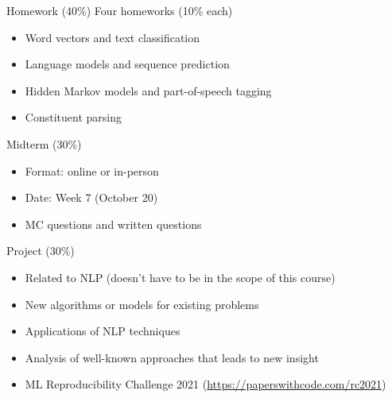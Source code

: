 \documentclass[usenames,dvipsnames,notes,11pt,aspectratio=169]{beamer}
\begin{document}
\begin{frame}
    {Homework (40\%)}
    Four homeworks (10\% each)
    \begin{itemize}
        \itemsep1em
        \item Word vectors and text classification
        \item Language models and sequence prediction
        \item Hidden Markov models and part-of-speech tagging 
        \item Constituent parsing 
    \end{itemize}
\end{frame}

\begin{frame}
    {Midterm (30\%)}
    \begin{itemize}
        \itemsep1em
        \item Format: online or in-person
        \item Date: Week 7 (October 20)
        \item MC questions and written questions
    \end{itemize}
\end{frame}

\begin{frame}
    {Project (30\%)}
    \begin{itemize}
        \itemsep1em
        \item Related to NLP (doesn't have to be in the scope of this course)
        \item New algorithms or models for existing problems
        \item Applications of NLP techniques 
        \item Analysis of well-known approaches that leads to new insight
        \item ML Reproducibility Challenge 2021 (\url{https://paperswithcode.com/rc2021}) 
    \end{itemize}
\end{frame}
\end{document}
